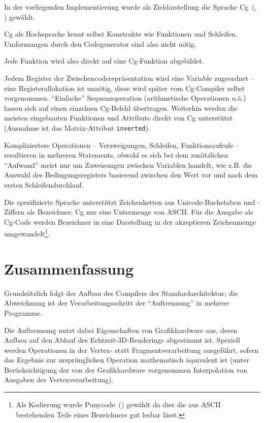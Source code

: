 \documentclass[twoside,a4paper,fleqn,12pt]{book}
\begin{document}
\renewcommand{\baselinestretch}{1.40}\normalsize
In der vorliegenden Implementierung wurde als Zieldarstellung die Sprache Cg~(\cite{cgpaper}, \cite{cg_home}) gewählt.

Cg als Hochsprache kennt selbst Konstrukte wie Funktionen und Schleifen. Umformungen durch den Codegenerator
sind also nicht nötig.

Jede Funktion wird also direkt auf eine Cg-Funktion abgebildet.

Jedem Register der Zwischencoderepräsentation wird eine Variable zugeordnet -- eine Re\-gis\-ter\-al\-lo\-ka\-tion ist unnötig, diese wird später vom Cg-Compiler selbst vorgenommen.
"`Einfache"' Sequenzoperation (arithmetische Operationen u.ä.) lassen sich auf einen einzelnen Cg-Befehl übertragen. 
Weiterhin werden die meisten eingebauten Funktionen und Attribute direkt von Cg unterstützt (Ausnahme ist das Matrix-Attribut \texttt{inverted}).

Kompliziertere Operationen -- Verzweigungen, Schleifen, Funktionsaufrufe -- resultieren in mehreren Statements, obwohl es sich bei dem
zusätzlichen "`Aufwand"' meist nur um Zuweisungen zwischen Variablen handelt, wie z.B. die Auswahl des Bedingungsregisters basierend zwischen
den Wert vor und nach dem ersten Schleifendurchlauf.

Die spezifizierte Sprache unterstützt Zeichenketten aus Unicode-Buchstaben und -Ziffern als Bezeichner;
Cg nur eine Untermenge von ASCII. Für die Ausgabe als Cg-Code werden Bezeichner in eine Darstellung in der akzeptieren
Zeichenmenge umgewandelt\footnote{Als Kodierung wurde Punycode~(\cite{rfc3492}) gewählt da dies die aus ASCII bestehenden Teile eines Bezeichners
gut lesbar lässt.}.

\renewcommand{\baselinestretch}{1.50}\normalsize

\newpage
\section{Zusammenfassung}

Grundsätzlich folgt der Aufbau des Compilers der Standardarchitektur; die Abweichnung ist der Verarbeitungsschritt der "`Auftrennung"' in mehrere
Programme.

Die Auftrennung nutzt dabei Eigenschaften von Grafikhardware aus, deren Aufbau auf den Ablauf des Echtzeit-3D-Renderings abgestimmt ist.
Speziell werden Operationen in der Vertex- statt Fragmentverarbeitung ausgeführt, sofern das Ergebnis zur ursprünglichen Operation mathematisch äquivalent ist
(unter Berücksichtigung der von der Grafikhardware vorgenommen Interpolation von Ausgaben der Vertexverarbeitung).
\end{document}
